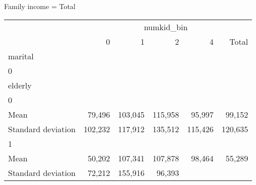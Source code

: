 Family income = Total
\begin{tabular}{llllll}
\cline{1-6}
\multicolumn{1}{c}{} &
  \multicolumn{5}{|c}{numkid\_bin} \\
\multicolumn{1}{c}{} &
  \multicolumn{1}{|r}{0} &
  \multicolumn{1}{r}{1} &
  \multicolumn{1}{r}{2} &
  \multicolumn{1}{r}{4} &
  \multicolumn{1}{r}{Total} \\
\cline{1-6}
\multicolumn{1}{l}{marital} &
  \multicolumn{1}{|r}{} &
  \multicolumn{1}{r}{} &
  \multicolumn{1}{r}{} &
  \multicolumn{1}{r}{} &
  \multicolumn{1}{r}{} \\
\multicolumn{1}{l}{\hspace{1em}0} &
  \multicolumn{1}{|r}{} &
  \multicolumn{1}{r}{} &
  \multicolumn{1}{r}{} &
  \multicolumn{1}{r}{} &
  \multicolumn{1}{r}{} \\
\multicolumn{1}{l}{\hspace{2em}elderly} &
  \multicolumn{1}{|r}{} &
  \multicolumn{1}{r}{} &
  \multicolumn{1}{r}{} &
  \multicolumn{1}{r}{} &
  \multicolumn{1}{r}{} \\
\multicolumn{1}{l}{\hspace{3em}0} &
  \multicolumn{1}{|r}{} &
  \multicolumn{1}{r}{} &
  \multicolumn{1}{r}{} &
  \multicolumn{1}{r}{} &
  \multicolumn{1}{r}{} \\
\multicolumn{1}{l}{\hspace{4em}Mean} &
  \multicolumn{1}{|r}{79,496} &
  \multicolumn{1}{r}{103,045} &
  \multicolumn{1}{r}{115,958} &
  \multicolumn{1}{r}{95,997} &
  \multicolumn{1}{r}{99,152} \\
\multicolumn{1}{l}{\hspace{4em}Standard deviation} &
  \multicolumn{1}{|r}{102,232} &
  \multicolumn{1}{r}{117,912} &
  \multicolumn{1}{r}{135,512} &
  \multicolumn{1}{r}{115,426} &
  \multicolumn{1}{r}{120,635} \\
\multicolumn{1}{l}{\hspace{3em}1} &
  \multicolumn{1}{|r}{} &
  \multicolumn{1}{r}{} &
  \multicolumn{1}{r}{} &
  \multicolumn{1}{r}{} &
  \multicolumn{1}{r}{} \\
\multicolumn{1}{l}{\hspace{4em}Mean} &
  \multicolumn{1}{|r}{50,202} &
  \multicolumn{1}{r}{107,341} &
  \multicolumn{1}{r}{107,878} &
  \multicolumn{1}{r}{98,464} &
  \multicolumn{1}{r}{55,289} \\
\multicolumn{1}{l}{\hspace{4em}Standard deviation} &
  \multicolumn{1}{|r}{72,212} &
  \multicolumn{1}{r}{155,916} &
  \multicolumn{1}{r}{96,393} &

\end{tabular}
